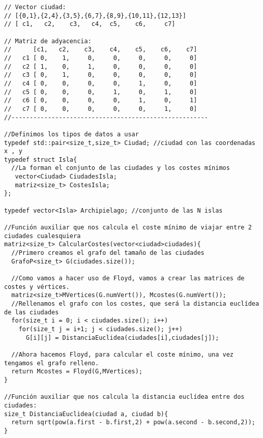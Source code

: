 \begin{verbatim}
// Vector ciudad:
// [{0,1},{2,4},{3,5},{6,7},{8,9},{10,11},{12,13}]
// [ c1,   c2,    c3,   c4,  c5,    c6,     c7]

// Matriz de adyacencia:
//      [c1,   c2,    c3,    c4,    c5,    c6,    c7]
//   c1 [ 0,    1,     0,     0,     0,     0,     0]
//   c2 [ 1,    0,     1,     0,     0,     0,     0]
//   c3 [ 0,    1,     0,     0,     0,     0,     0]
//   c4 [ 0,    0,     0,     0,     1,     0,     0]
//   c5 [ 0,    0,     0,     1,     0,     1,     0]
//   c6 [ 0,    0,     0,     0,     1,     0,     1]
//   c7 [ 0,    0,     0,     0,     0,     1,     0]
//------------------------------------------------------

//Definimos los tipos de datos a usar
typedef std::pair<size_t,size_t> Ciudad; //ciudad con las coordenadas x , y
typedef struct Isla{ 
  //La forman el conjunto de las ciudades y los costes mínimos
   vector<Ciudad> CiudadesIsla;
   matriz<size_t> CostesIsla;
};

typedef vector<Isla> Archipielago; //conjunto de las N islas

//Función auxiliar que nos calcula el coste mínimo de viajar entre 2 ciudades cualesquiera
matriz<size_t> CalcularCostes(vector<ciudad>ciudades){
  //Primero creamos el grafo del tamaño de las ciudades
  GrafoP<size_t> G(ciudades.size());

  //Como vamos a hacer uso de Floyd, vamos a crear las matrices de costes y vértices.
  matriz<size_t>MVertices(G.numVert()), Mcostes(G.numVert());
  //Rellenamos el grafo con los costes, que será la distancia euclídea de las ciudades
  for(size_t i = 0; i < ciudades.size(); i++)
    for(size_t j = i+1; j < ciudades.size(); j++)
      G[i][j] = DistanciaEuclidea(ciudades[i],ciudades[j]);

  //Ahora hacemos Floyd, para calcular el coste mínimo, una vez tengamos el grafo relleno.
  return Mcostes = Floyd(G,MVertices);
}

//Función auxiliar que nos calcula la distancia euclídea entre dos ciudades:
size_t DistanciaEuclidea(ciudad a, ciudad b){
  return sqrt(pow(a.first - b.first,2) + pow(a.second - b.second,2));
}


\end{verbatim}
